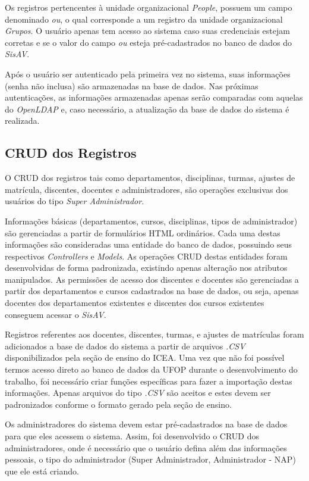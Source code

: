 \documentclass[
  12pt,       %
  openright,      %
  oneside,      %
  a4paper,      %
  english,      %
  french,        %
  spanish,     %
  brazil        %
  ]{abntex2-decsi}
\begin{document}
    Os registros pertencentes à unidade organizacional \textit{People}, possuem um campo denominado \textit{ou}, o qual corresponde a um registro da unidade organizacional \textit{Grupos}. O usuário apenas tem acesso ao sistema caso suas credenciais estejam corretas e se o valor do campo \textit{ou} esteja pré-cadastrados no banco de dados do \textit{SisAV}. 

    Após o usuário ser autenticado pela primeira vez no sistema, suas informações (senha não inclusa) são armazenadas na base de dados. Nas próximas autenticações, as informações armazenadas apenas serão comparadas com aquelas do \textit{OpenLDAP} e, caso necessário, a atualização da base de dados do sistema é realizada.

        \subsection{CRUD dos Registros}

    O CRUD dos registros tais como departamentos, disciplinas, turmas, ajustes de matrícula, discentes, docentes e administradores, são operações exclusivas dos usuários do tipo \textit{Super Administrador}. 

    Informações básicas (departamentos, cursos, disciplinas, tipos de administrador) são gerenciadas a partir de formulários HTML ordinários. Cada uma destas informações são consideradas uma entidade do banco de dados, possuindo seus respectivos \textit{Controllers} e \textit{Models}. As operações CRUD destas entidades foram desenvolvidas de forma padronizada, existindo apenas alteração nos atributos manipulados. As permissões de acesso dos discentes e docentes são gerenciadas a partir dos departamentos e cursos cadastrados na base de dados, ou seja, apenas docentes dos departamentos existentes e discentes dos cursos existentes conseguem acessar o \textit{SisAV}.     

    Registros referentes aos docentes, discentes, turmas, e ajustes de matrículas foram adicionados a base de dados do sistema a partir de arquivos \textit{.CSV} disponibilizados pela seção de ensino do ICEA. Uma vez que não foi possível termos acesso direto ao banco de dados da UFOP durante o desenvolvimento do trabalho, foi necessário criar funções específicas para fazer a importação destas informações. Apenas arquivos do tipo \textit{.CSV} são aceitos e estes devem ser padronizados conforme o formato gerado pela seção de ensino.

    Os administradores do sistema devem estar pré-cadastrados na base de dados para que eles acessem o sistema. Assim, foi desenvolvido o CRUD dos administradores, onde é necessário que o usuário defina além das informações pessoais, o tipo do administrador (Super Administrador, Administrador - NAP) que ele está criando. 
\end{document}
